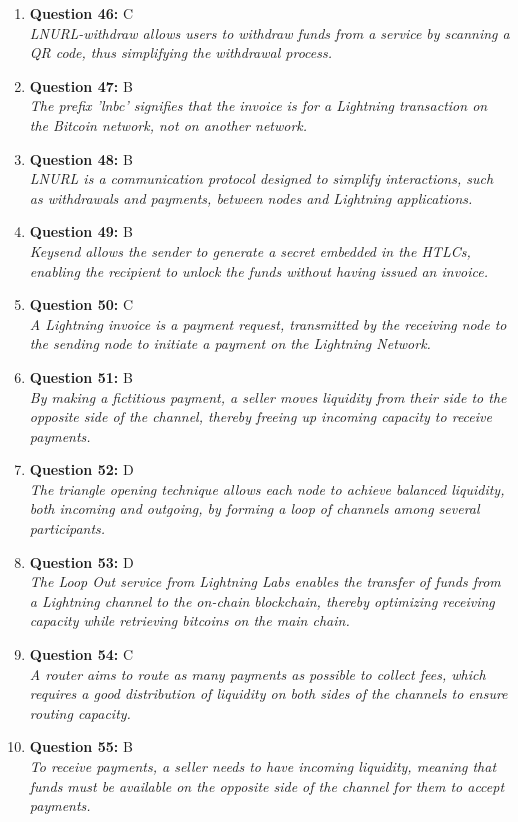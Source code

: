\documentclass[12pt,a4paper]{article}
\begin{document}
\begin{enumerate}
\item \textbf{Question 46:} C
\\ \textit{LNURL-withdraw allows users to withdraw funds from a service by scanning a QR code, thus simplifying the withdrawal process.}

\item \textbf{Question 47:} B
\\ \textit{The prefix 'lnbc' signifies that the invoice is for a Lightning transaction on the Bitcoin network, not on another network.}

\item \textbf{Question 48:} B
\\ \textit{LNURL is a communication protocol designed to simplify interactions, such as withdrawals and payments, between nodes and Lightning applications.}

\item \textbf{Question 49:} B
\\ \textit{Keysend allows the sender to generate a secret embedded in the HTLCs, enabling the recipient to unlock the funds without having issued an invoice.}

\item \textbf{Question 50:} C
\\ \textit{A Lightning invoice is a payment request, transmitted by the receiving node to the sending node to initiate a payment on the Lightning Network.}

\item \textbf{Question 51:} B
\\ \textit{By making a fictitious payment, a seller moves liquidity from their side to the opposite side of the channel, thereby freeing up incoming capacity to receive payments.}

\item \textbf{Question 52:} D
\\ \textit{The triangle opening technique allows each node to achieve balanced liquidity, both incoming and outgoing, by forming a loop of channels among several participants.}

\item \textbf{Question 53:} D
\\ \textit{The Loop Out service from Lightning Labs enables the transfer of funds from a Lightning channel to the on-chain blockchain, thereby optimizing receiving capacity while retrieving bitcoins on the main chain.}

\item \textbf{Question 54:} C
\\ \textit{A router aims to route as many payments as possible to collect fees, which requires a good distribution of liquidity on both sides of the channels to ensure routing capacity.}

\item \textbf{Question 55:} B
\\ \textit{To receive payments, a seller needs to have incoming liquidity, meaning that funds must be available on the opposite side of the channel for them to accept payments.}


\end{enumerate}
\end{document}
